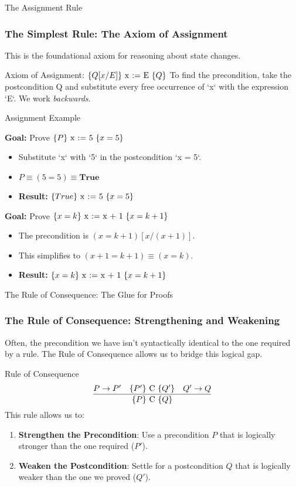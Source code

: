 \documentclass[aspectratio=169]{beamer}
\newcommand{\code}[1]{\lstinline|#1|}
\newcommand{\hoare}[3]{\ensuremath{\{#1\}\ \code{#2}\ \{#3\}}}
\begin{document}
\begin{frame}{The Assignment Rule}
    \frametitle{The Simplest Rule: The Axiom of Assignment}
    This is the foundational axiom for reasoning about state changes.
    
    \begin{alertblock}{Axiom of Assignment: \hoare{Q[x/E]}{x := E}{Q}}
        To find the precondition, take the postcondition Q and substitute every free occurrence of `x` with the expression `E`. We work \textit{backwards}.
    \end{alertblock}
\end{frame}
\begin{frame}{Assignment Example}
    \begin{example}
        \textbf{Goal:} Prove \hoare{P}{x := 5}{x = 5}
        \begin{itemize}
            \item Substitute `x` with `5` in the postcondition `x = 5`.
            \item $P \equiv (5 = 5) \equiv \textbf{True}$
            \item \textbf{Result:} \hoare{True}{x := 5}{x = 5}
        \end{itemize}
    \end{example}
    \pause
    \begin{example}
        \textbf{Goal:} Prove \hoare{x = k}{x := x + 1}{x = k + 1}
        \begin{itemize}
            \item The precondition is $(x = k + 1)[x/(x + 1)]$.
            \item This simplifies to $(x + 1 = k + 1) \equiv (x = k)$.
            \item \textbf{Result:} \hoare{x = k}{x := x + 1}{x = k + 1}
        \end{itemize}
    \end{example}
    
\end{frame}

\begin{frame}{The Rule of Consequence: The Glue for Proofs}
    \frametitle{The Rule of Consequence: Strengthening and Weakening}
    Often, the precondition we have isn't syntactically identical to the one required by a rule. The Rule of Consequence allows us to bridge this logical gap.
    
    \begin{block}{Rule of Consequence}
        \[ \frac{P \rightarrow P' \quad \hoare{P'}{C}{Q'} \quad Q' \rightarrow Q}{\hoare{P}{C}{Q}} \]
        This rule allows us to:
        \begin{enumerate}
            \item \textbf{Strengthen the Precondition}: Use a precondition $P$ that is logically stronger than the one required ($P'$).
            \item \textbf{Weaken the Postcondition}: Settle for a postcondition $Q$ that is logically weaker than the one we proved ($Q'$).
        \end{enumerate}
    \end{block}
\end{frame}
\end{document}
